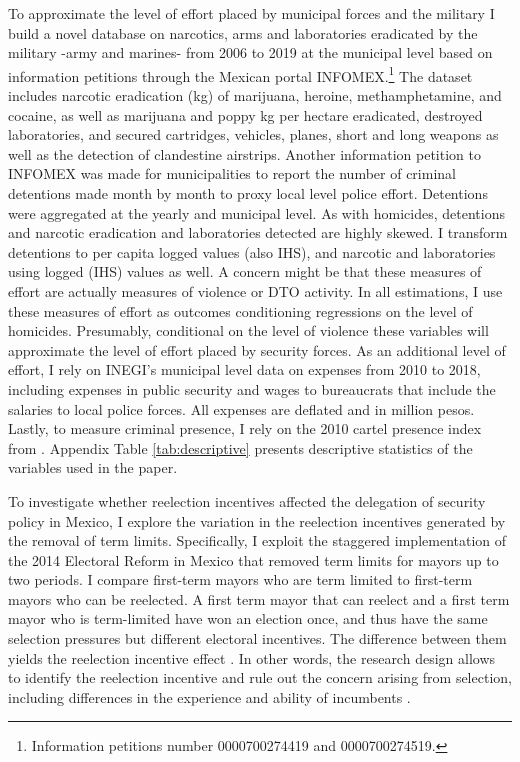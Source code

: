 \documentclass[12pt]{amsart}
\makeatletter
\def\section{\@startsection{section}{1}
	\z@{1.0\linespacing\@plus\linespacing}{.5\linespacing}{\Large}}
\numberwithin{equation}{section}
\theoremstyle{definition}
\theoremstyle{definition}
\theoremstyle{definition}
\makeatother
\begin{document}
To approximate the level of effort placed by municipal forces and the military I build a novel database on narcotics, arms and laboratories eradicated by the military -army and marines- from 2006 to 2019 at the municipal level  based on information petitions through the Mexican portal INFOMEX.\footnote{Information petitions number 0000700274419 and 0000700274519.} The dataset includes narcotic eradication (kg) of marijuana, heroine, methamphetamine, and cocaine, as well as marijuana and poppy kg per hectare eradicated, destroyed laboratories, and secured cartridges, vehicles, planes, short and long weapons as well as the detection of clandestine airstrips.  Another information petition to INFOMEX was made for municipalities to report the number of criminal detentions made month by month to proxy local level police effort. Detentions were aggregated at the yearly and municipal level. As with homicides, detentions and narcotic eradication and laboratories detected are highly skewed. I transform detentions to per capita logged values (also IHS), and narcotic and laboratories using logged (IHS) values as well. A concern might be that these measures of effort are actually measures of violence or DTO activity. In all estimations, I use these measures of effort as outcomes conditioning regressions on the level of homicides. Presumably, conditional on the level of violence these variables will approximate the level of effort placed by security forces. As an additional level of effort,  I rely on INEGI's municipal level data on expenses from 2010 to 2018, including expenses in public security  and wages to bureaucrats that include the salaries to local police forces. All expenses are deflated and in million pesos. Lastly, to measure criminal presence, I rely on the 2010 cartel presence index from \citet{camilo_etal_2018}. 
 Appendix Table \ref{tab:descriptive} presents descriptive statistics of the variables used in the paper.
  
\section{Research Design \label{sec:design}}  
     
To investigate whether reelection incentives affected the delegation of security policy in Mexico, I explore the variation in the reelection incentives generated by the removal of term limits.  Specifically, I exploit the staggered implementation of the 2014 Electoral Reform in Mexico that removed term limits for mayors up to two periods. I compare first-term mayors who are term limited to first-term mayors who can be reelected. A first term mayor that can reelect and a first term mayor who is term-limited have won an election once, and thus have the same selection pressures but different electoral incentives. The difference between them yields the reelection incentive effect \citep{Besley_case_1995, ashworth_2012}. In other words, the research design allows to identify the reelection incentive and rule out the concern arising from selection, including differences in the experience and ability of incumbents \citep{ferraz_finan_2011}. 
\end{document}
